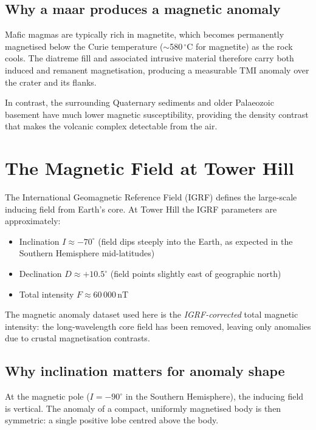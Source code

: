 \documentclass[11pt,a4paper]{article}
\begin{document}
\subsection{Why a maar produces a magnetic anomaly}

Mafic magmas are typically rich in magnetite, which becomes permanently
magnetised below the Curie temperature ($\sim$580\,$^{\circ}$C for magnetite)
as the rock cools.
The diatreme fill and associated intrusive material therefore carry both
induced and remanent magnetisation, producing a measurable TMI anomaly
over the crater and its flanks.

In contrast, the surrounding Quaternary sediments and older Palaeozoic basement
have much lower magnetic susceptibility, providing the density contrast that
makes the volcanic complex detectable from the air.

\section{The Magnetic Field at Tower Hill}

The International Geomagnetic Reference Field (IGRF) defines the large-scale
inducing field from Earth's core.
At Tower Hill the IGRF parameters are approximately:
\begin{itemize}
  \item Inclination $I \approx -70^\circ$ (field dips steeply into the Earth,
        as expected in the Southern Hemisphere mid-latitudes)
  \item Declination $D \approx +10.5^\circ$ (field points slightly east of
        geographic north)
  \item Total intensity $F \approx 60\,000$\,nT
\end{itemize}

The magnetic anomaly dataset used here is the \emph{IGRF-corrected} total
magnetic intensity: the long-wavelength core field has been removed, leaving
only anomalies due to crustal magnetisation contrasts.

\subsection{Why inclination matters for anomaly shape}

At the magnetic pole ($I = -90^\circ$ in the Southern Hemisphere), the inducing
field is vertical.
The anomaly of a compact, uniformly magnetised body is then symmetric: a
single positive lobe centred above the body.
\end{document}
